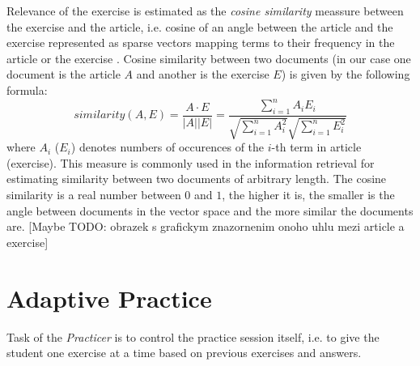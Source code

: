 \documentclass[a4paper, 12pt, twoside]{fithesis2}		%
\renewcommand{\_}{\leavevmode \kern0.0em\vbox{\hrule width0.4em}}
\begin{document}
Relevance of the exercise is estimated as the \textit{cosine similarity} meassure between the exercise and the article,
i.e. cosine of an angle between the article and the exercise represented as sparse vectors mapping terms to their frequency in the article or the exercise
\cite[][121]{information-retrieval}.
Cosine similarity between two documents (in our case one document is the article $A$ and another is the exercise $E$) is given by the following formula:
$$
similarity(A, E)
= \frac{A \cdot E}{|A| |E|}
= \frac{\sum_{i=1}^{n} A_i E_i}{\sqrt{\sum_{i=1}^{n} A_i^2}\sqrt{\sum_{i=1}^{n} E_i^2}}
$$
where $A_i$ ($E_i$) denotes numbers of occurences of the $i$-th term in article (exercise).
This measure is commonly used in the information retrieval for estimating similarity between two documents of arbitrary length. The cosine similarity is a real number between $0$ and $1$, the higher it is, the smaller is the angle between documents in the vector space and the more similar the documents are. [Maybe TODO: obrazek s grafickym znazornenim onoho uhlu mezi article a exercise]


\section{Adaptive Practice}
\label{sec:smartoo-practice}

Task of the \textit{Practicer} is to control the practice session itself, i.e. to give the student one exercise at a time based on previous exercises and answers.
\end{document}

